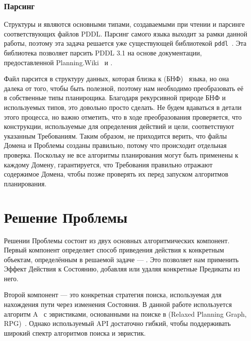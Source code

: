 \subsubsection{Парсинг}

Структуры  и  являются основными типами,
создаваемыми при чтении и парсинге соответствующих файлов PDDL.
Парсинг самого языка выходит за рамки данной работы,
поэтому эта задача решается уже существующей библиотекой \texttt{pddl}~\cite{pddl-crate}.
Эта библиотека позволяет парсить PDDL 3.1 на основе документации,
предоставленной Planning.Wiki~\cite{planning-wiki} и \textcite{kovacs2011complete}.

Файл парсится в структуру данных,
которая близка к  (БНФ)~\cite{bnf} языка,
но она далека от того, чтобы быть полезной,
поэтому нам необходимо преобразовать её в собственные типы планирощика.
Благодаря рекурсивной природе БНФ и используемых типов, это довольно просто сделать.
Не будем вдаваться в детали этого процесса, но важно отметить,
что в ходе преобразования проверяется, что конструкции,
используемые для определения действий и цели, соответствуют указанным Требованиям.
Таким образом, не приходится верить, что файлы Домена и Проблемы созданы правильно,
потому что происходит отдельная проверка.
Поскольку не все алгоритмы планирования могут быть применены к каждому Домену,
гарантируется, что Требования правильно отражают содержимое Домена,
чтобы позже проверять их перед запуском алгоритмов планирования.

\section{Решение Проблемы}

Решении Проблемы состоит из двух основных алгоритмических компонент.
Первый компонент определяет способ приведения действия к конкретным объектам,
определённым в решаемой задаче --- .
Это позволяет нам применить Эффект Действия к Состоянию,
добавляя или удаляя конкретные Предикаты из него.

Второй компонент --- это конкретная стратегия поиска,
используемая для нахождения пути через изменения Состояния.
В данной работе используется алгоритм A\*~\cite{astar} с эвристиками,
основанными на поиске в 
(Relaxed Planning Graph, RPG)~\cite{BLUM1997281,Hoffmann_2001,bryce2007planninggraph}.
Однако используемый API достаточно гибкий,
чтобы поддерживать широкий спектр алгоритмов поиска и эвристик.

